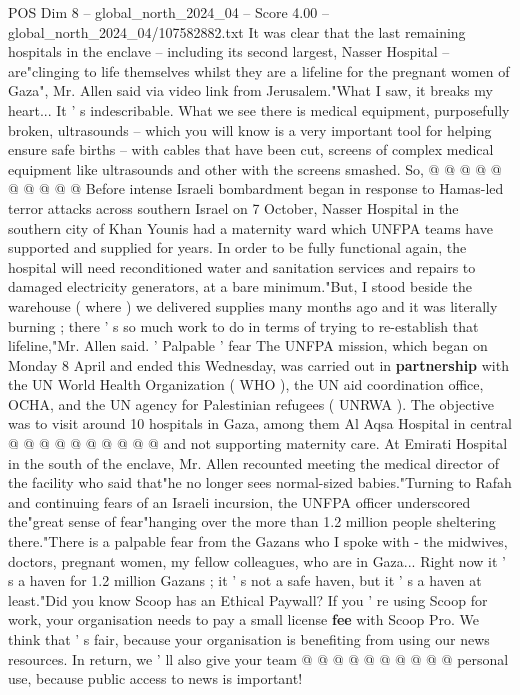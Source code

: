 \begin{textsample}{POS Dim 8 – global\_north\_2024\_04 – Score 4.00 – global\_north\_2024\_04/107582882.txt}
It was clear that the last remaining hospitals in the enclave -- including its second largest, Nasser Hospital -- are"clinging to life themselves whilst they are a lifeline for the pregnant women of Gaza", Mr.
Allen said via video link from Jerusalem."What I saw, it breaks my heart...
It ' s indescribable.
What we see there is medical equipment, purposefully broken, ultrasounds -- which you will know is a very important tool for helping ensure safe births -- with cables that have been cut, screens of complex medical equipment like ultrasounds and other with the screens smashed.
So, @ @ @ @ @ @ @ @ @ @ Before intense Israeli bombardment began in response to Hamas-led terror attacks across southern Israel on 7 October, Nasser Hospital in the southern city of Khan Younis had a maternity ward which UNFPA teams have supported and supplied for years.
In order to be fully functional again, the hospital will need reconditioned water and sanitation services and repairs to damaged electricity generators, at a bare minimum."But, I stood beside the warehouse ( where ) we delivered supplies many months ago and it was literally burning ; there ' s so much work to do in terms of trying to re-establish that lifeline,"Mr.
Allen said. ' Palpable ' fear The UNFPA mission, which began on Monday 8 April and ended this Wednesday, was carried out in \textbf{partnership} with the UN World Health Organization ( WHO ), the UN aid coordination office, OCHA, and the UN agency for Palestinian refugees ( UNRWA ).
The objective was to visit around 10 hospitals in Gaza, among them Al Aqsa Hospital in central @ @ @ @ @ @ @ @ @ @ and not supporting maternity care.
At Emirati Hospital in the south of the enclave, Mr.
Allen recounted meeting the medical director of the facility who said that"he no longer sees normal-sized babies."Turning to Rafah and continuing fears of an Israeli incursion, the UNFPA officer underscored the"great sense of fear"hanging over the more than 1.2 million people sheltering there."There is a palpable fear from the Gazans who I spoke with - the midwives, doctors, pregnant women, my fellow colleagues, who are in Gaza...
Right now it ' s a haven for 1.2 million Gazans ; it ' s not a safe haven, but it ' s a haven at least."Did you know Scoop has an Ethical Paywall?
If you ' re using Scoop for work, your organisation needs to pay a small license \textbf{fee} with Scoop Pro.
We think that ' s fair, because your organisation is benefiting from using our news resources.
In return, we ' ll also give your team @ @ @ @ @ @ @ @ @ @ personal use, because public access to news is important!

\end{textsample}

